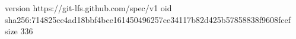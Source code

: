 version https://git-lfs.github.com/spec/v1
oid sha256:714825ce4ad18bbf4bce161450496257ce34117b82d425b57858838f9608fcef
size 336
